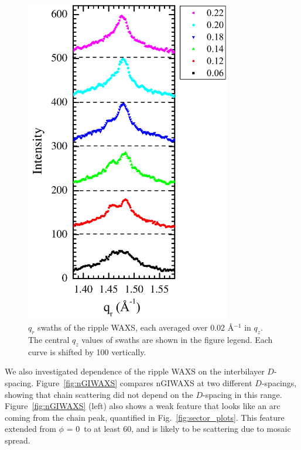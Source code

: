 \begin{figure}[htbp]
  \centering
  \includegraphics[width=0.8\textwidth]{figures/ripple/nGIWAXS/qrplots}
  \caption[$q_r$ swaths of the ripple WAXS, each averaged over 0.02 \AA$^{-1}$
  in $q_z$]
  {$q_r$ swaths of the ripple WAXS, each averaged over 0.02 \AA$^{-1}$
  in $q_z$. 
  The central $q_z$ values of swaths are shown in the figure legend.  
  Each curve is shifted by 100 vertically.}
  \label{fig:qrplots}
\end{figure}

We also investigated dependence of the ripple WAXS on the interbilayer
$D$-spacing. Figure~\ref{fig:nGIWAXS} compares nGIWAXS at two different 
$D$-spacings,
showing that chain scattering did not depend on the $D$-spacing in this range. 
Figure~\ref{fig:nGIWAXS} (left) also shows a weak feature that looks like an 
arc coming from the chain peak, quantified in 
Fig.~\ref{fig:sector_plots}. This feature extended
from $\phi$ = 0\textdegree\ to at least 60\textdegree, and
is likely to be scattering due to mosaic spread.

